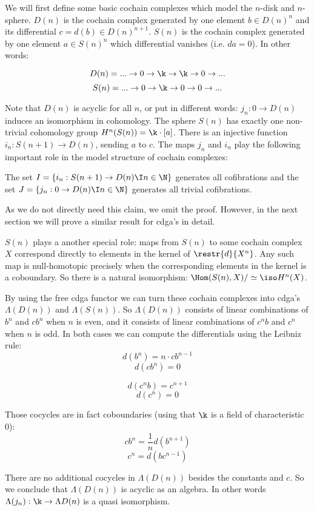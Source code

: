 
We will first define some basic cochain complexes which model the $n$-disk and $n$-sphere. $D(n)$ is the cochain complex generated by one element $b \in D(n)^n$ and its differential $c = d(b) \in D(n)^{n+1}$. $S(n)$ is the cochain complex generated by one element $a \in S(n)^n$ which differential vanishes (i.e. $d a = 0$). In other words:

$$ D(n) = ... \to 0 \to \k \to \k \to 0 \to ... $$
$$ S(n) = ... \to 0 \to \k \to 0 \to 0 \to ... $$

Note that $D(n)$ is acyclic for all $n$, or put in different words: $j_n : 0 \to D(n)$ induces an isomorphism in cohomology. The sphere $S(n)$ has exactly one non-trivial cohomology group $H^n(S(n)) = \k \cdot [a]$. There is an injective function $i_n : S(n+1) \to D(n)$, sending $a$ to $c$. The maps $j_n$ and $i_n$ play the following important role in the model structure of cochain complexes:

\begin{claim}
	The set $I = \{i_n : S(n+1) \to D(n) \I n \in \N\}$ generates all cofibrations and the set $J = \{j_n : 0 \to D(n) \I n \in \N\}$ generates all trivial cofibrations.
\end{claim}

As we do not directly need this claim, we omit the proof. However, in the next section we will prove a similar result for cdga's in detail.

$S(n)$ plays a another special role: maps from $S(n)$ to some cochain complex $X$ correspond directly to elements in the kernel of $\restr{d}{X^n}$. Any such map is null-homotopic precisely when the corresponding elements in the kernel is a coboundary. So there is a natural isomorphism: $\Hom(S(n), X) / \simeq \iso H^n(X)$.

By using the free cdga functor we can turn these cochain complexes into cdga's $\Lambda(D(n))$ and $\Lambda(S(n))$. So $\Lambda(D(n))$ consists of linear combinations of $b^n$ and $c b^n$ when $n$ is even, and it consists of linear combinations of $c^n b$ and $c^n$ when $n$ is odd. In both cases we can compute the differentials using the Leibniz rule:
$$ d(b^n) = n \cdot c b^{n-1} $$
$$ d(c b^n) = 0 $$

$$ d(c^n b) = c^{n+1} $$
$$ d(c^n) = 0 $$

Those cocycles are in fact coboundaries (using that $\k$ is a field of characteristic $0$):
$$ c b^n = \frac{1}{n} d(b^{n+1}) $$
$$ c^n = d(b c^{n-1}) $$

There are no additional cocycles in $\Lambda(D(n))$ besides the constants and $c$. So we conclude that $\Lambda(D(n))$ is acyclic as an algebra. In other words $\Lambda(j_n): \k \to \Lambda D(n)$ is a quasi isomorphism.

